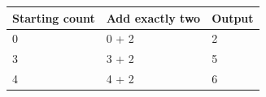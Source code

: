 \begin{center}\begin{tabular}{lll}\toprule
Starting count & Add exactly two & Output \\\midrule
0 & 0 + 2 & 2 \\
3 & 3 + 2 & 5 \\
4 & 4 + 2 & 6 \\\bottomrule
\end{tabular}\end{center}
